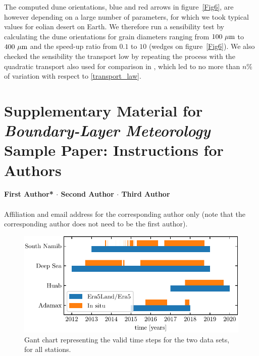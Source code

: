 The computed dune orientations, blue and red arrows in figure~\ref{Fig6}, are however depending on a large number of parameters, for which we took typical values for eolian desert on Earth. We therefore run a sensibility test by calculating the dune orientations for grain diameters ranging from $100~\mu\textup{m}$ to $400~\mu\textup{m}$ and the speed-up ratio from $0.1$ to $10$ (wedges on figure~\ref{Fig6}). We also checked the sensibility the transport low by repeating the process with the quadratic transport also used for comparison in \citet{Pahtz2020}, which led to no more than $n\%$ of variation with respect to \eqref{transport_law}.


\clearpage




\newpage
\renewcommand{\thefigure}{S\arabic{figure}}
\setcounter{figure}{0}

\section*{Supplementary Material for \textit{Boundary-Layer Meteorology} Sample Paper: Instructions for Authors}

{\textbf{First Author* $\cdot$ Second Author $\cdot$ Third Author \\}}
\\
\text{*}Affiliation and email address for the corresponding author only (note that the corresponding author does not need to be the first author).

\begin{figure}
  \centering
  \includegraphics[scale=1]{Figures/Figure1_supp.pdf}
  \caption{Gant chart representing the valid time steps for the two data sets, for all stations.}
  \label{Fig1_supp}
\end{figure}

